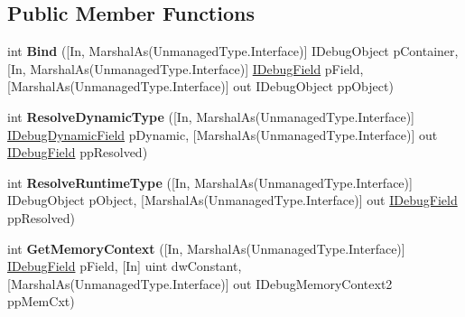 \subsection*{Public Member Functions}
\begin{DoxyCompactItemize}
\item 
\hypertarget{interface_microsoft_1_1_visual_studio_1_1_debugger_1_1_interop_e_e_1_1_i_debug_binder_ad632fb21603a4c249520e0f9c8177726}{int {\bfseries Bind} (\mbox{[}In, Marshal\+As(Unmanaged\+Type.\+Interface)\mbox{]} I\+Debug\+Object p\+Container, \mbox{[}In, Marshal\+As(Unmanaged\+Type.\+Interface)\mbox{]} \hyperlink{interface_microsoft_1_1_visual_studio_1_1_debugger_1_1_interop_e_e_1_1_i_debug_field}{I\+Debug\+Field} p\+Field, \mbox{[}Marshal\+As(Unmanaged\+Type.\+Interface)\mbox{]} out I\+Debug\+Object pp\+Object)}\label{interface_microsoft_1_1_visual_studio_1_1_debugger_1_1_interop_e_e_1_1_i_debug_binder_ad632fb21603a4c249520e0f9c8177726}

\item 
\hypertarget{interface_microsoft_1_1_visual_studio_1_1_debugger_1_1_interop_e_e_1_1_i_debug_binder_ad711dedbacd7fed33ae43befac40b3bd}{int {\bfseries Resolve\+Dynamic\+Type} (\mbox{[}In, Marshal\+As(Unmanaged\+Type.\+Interface)\mbox{]} \hyperlink{interface_microsoft_1_1_visual_studio_1_1_debugger_1_1_interop_e_e_1_1_i_debug_dynamic_field}{I\+Debug\+Dynamic\+Field} p\+Dynamic, \mbox{[}Marshal\+As(Unmanaged\+Type.\+Interface)\mbox{]} out \hyperlink{interface_microsoft_1_1_visual_studio_1_1_debugger_1_1_interop_e_e_1_1_i_debug_field}{I\+Debug\+Field} pp\+Resolved)}\label{interface_microsoft_1_1_visual_studio_1_1_debugger_1_1_interop_e_e_1_1_i_debug_binder_ad711dedbacd7fed33ae43befac40b3bd}

\item 
\hypertarget{interface_microsoft_1_1_visual_studio_1_1_debugger_1_1_interop_e_e_1_1_i_debug_binder_a47367ba1bd94026887170fff4baf71ff}{int {\bfseries Resolve\+Runtime\+Type} (\mbox{[}In, Marshal\+As(Unmanaged\+Type.\+Interface)\mbox{]} I\+Debug\+Object p\+Object, \mbox{[}Marshal\+As(Unmanaged\+Type.\+Interface)\mbox{]} out \hyperlink{interface_microsoft_1_1_visual_studio_1_1_debugger_1_1_interop_e_e_1_1_i_debug_field}{I\+Debug\+Field} pp\+Resolved)}\label{interface_microsoft_1_1_visual_studio_1_1_debugger_1_1_interop_e_e_1_1_i_debug_binder_a47367ba1bd94026887170fff4baf71ff}

\item 
\hypertarget{interface_microsoft_1_1_visual_studio_1_1_debugger_1_1_interop_e_e_1_1_i_debug_binder_a4d22a0ee5b34ddade60dec5d452e3293}{int {\bfseries Get\+Memory\+Context} (\mbox{[}In, Marshal\+As(Unmanaged\+Type.\+Interface)\mbox{]} \hyperlink{interface_microsoft_1_1_visual_studio_1_1_debugger_1_1_interop_e_e_1_1_i_debug_field}{I\+Debug\+Field} p\+Field, \mbox{[}In\mbox{]} uint dw\+Constant, \mbox{[}Marshal\+As(Unmanaged\+Type.\+Interface)\mbox{]} out I\+Debug\+Memory\+Context2 pp\+Mem\+Cxt)}\label{interface_microsoft_1_1_visual_studio_1_1_debugger_1_1_interop_e_e_1_1_i_debug_binder_a4d22a0ee5b34ddade60dec5d452e3293}


\end{DoxyCompactItemize}
